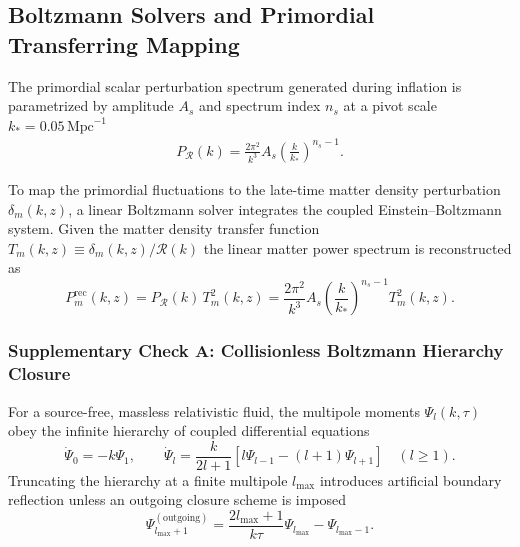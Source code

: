 \subsection{Boltzmann Solvers and Primordial Transferring Mapping}
\label{subsec:boltzmann_methodology}

The primordial scalar perturbation spectrum generated during inflation is parametrized by amplitude $A_s$ and spectrum index $n_s$ at a pivot scale $k_* = 0.05\,\mathrm{Mpc}^{-1}$
    \begin{align*}
        P_{\mathcal{R}}(k) = \frac{2\pi^2}{k^3} A_s \left( \frac{k}{k_*} \right)^{n_s - 1}.
        \label{eq:primordial_power_spectrum}
    \end{align*}

To map the primordial fluctuations to the late-time matter density perturbation $\delta_m(k,z)$, a linear Boltzmann solver integrates the coupled Einstein--Boltzmann system.
Given the matter density transfer function $T_m(k,z) \equiv \delta_m(k,z)/ \mathcal{R}(k)$ the linear matter power spectrum is reconstructed as
    \begin{equation}
        P_m^{\mathrm{rec}}(k, z) = P_{\mathcal{R}}(k) \, T_m^2(k, z) = \frac{2\pi^2}{k^3} A_s \left( \frac{k}{k_*} \right)^{n_s - 1} T_m^2(k, z).
        \label{eq:matter_spectrum_reconstruction}
    \end{equation}

\subsubsection{Supplementary Check A: Collisionless Boltzmann Hierarchy Closure}

For a source-free, massless relativistic fluid, the multipole moments $\Psi_l(k, \tau)$ obey the infinite hierarchy of coupled differential equations
    \begin{equation}
        \dot{\Psi}_0 = -k \Psi_1, \qquad \dot{\Psi}_l = \frac{k}{2l+1} \left[ l \Psi_{l-1} - (l+1) \Psi_{l+1} \right] \quad (l \ge 1).
        \label{eq:boltzmann_hierarchy}
    \end{equation}
Truncating the hierarchy at a finite multipole $l_{\mathrm{max}}$ introduces artificial boundary reflection unless an outgoing closure scheme is imposed
    \begin{equation}
        \Psi_{l_{\mathrm{max}}+1}^{(\mathrm{outgoing})} = \frac{2 l_{\mathrm{max}} + 1}{k \tau} \Psi_{l_{\mathrm{max}}} - \Psi_{l_{\mathrm{max}}-1}.
        \label{eq:hierarchy_outgoing_closure}
    \end{equation}

